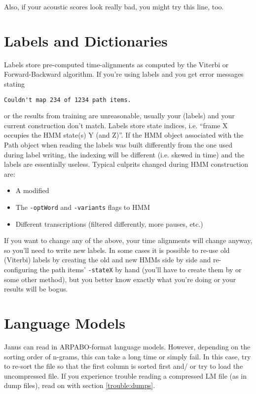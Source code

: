 Also, if your acoustic scores look really bad, you might try this
line, too.


\section{Labels and Dictionaries} \label{trouble:labeldict}

Labels store  pre-computed time-alignments as  computed by the Viterbi
or Forward-Backward  algorithm.  If you're  using labels  and  you get
error messages stating

\begin{verbatim}
Couldn't map 234 of 1234 path items.
\end{verbatim}

or  the  results     from training  are   unreasonable,   usually your
    (labels)   and your  current 
construction don't  match. Labels store  state indices, i.e. ``frame X
occupies the  HMM state(s) Y (and  Z)''. If the HMM  object associated
with the Path  object when  reading the  labels was  built differently
from the one used during label writing, the indexing will be different
(i.e. skewed in time) and the  labels are essentially useless. Typical
culprits changed during HMM construction are:

\begin{itemize}
\item A modified 
\item The \texttt{-optWord} and \texttt{-variants} flags to HMM 
\item Different transcriptions (filtered differently, more pauses, etc.)
\end{itemize}

If you want  to  change any of the   above, your time alignments  will
change anyway, so you'll need to write new labels. In some cases it is
possible to  re-use old (Viterbi) labels by  creating  the old and new
HMMs side by side  and re-configuring the path items' \texttt{-stateX}
by hand  (you'll have to  create  them by   or  some
other method),  but you better know exactly  what you're doing or your
results will be bogus.


\section{Language Models} \label{trouble:lm}

Janus can read in ARPABO-format language models. However, depending on
the sorting order  of  n-grams, this can  take  a long time or  simply
fail. In this case,  try to re-sort the file  so that the first column
is sorted  first and/ or try   to load the  uncompressed  file. If you
experience  trouble reading a compressed  LM file (as  in dump files),
read on with section \ref{trouble:dumps}.


